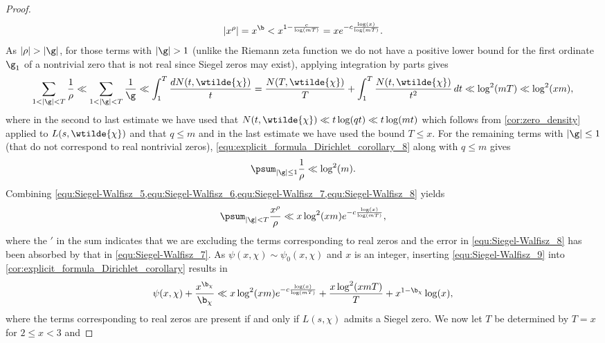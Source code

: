 \begin{proof}
      \begin{equation}\label{equ:Siegel-Walfisz_6}
        |x^{\rho}| = x^{\b} < x^{1-\frac{c}{\log(mT)}} = xe^{-c\frac{\log(x)}{\log(mT)}}.
      \end{equation}
      As $|\rho| > |\g|$, for those terms with $|\g| > 1$ (unlike the Riemann zeta function we do not have a positive lower bound for the first ordinate $\g_{1}$ of a nontrivial zero that is not real since Siegel zeros may exist), applying integration by parts gives
      \begin{equation}\label{equ:Siegel-Walfisz_7}
        \sum_{1 < |\g| < T}\frac{1}{\rho} \ll \sum_{1 < |\g| < T}\frac{1}{\g} \ll \int_{1}^{T}\frac{dN(t,\wtilde{\chi})}{t} = \frac{N(T,\wtilde{\chi})}{T}+\int_{1}^{T}\frac{N(t,\wtilde{\chi})}{t^{2}}\,dt \ll \log^{2}(mT) \ll \log^{2}(xm),
      \end{equation}
      where in the second to last estimate we have used that $N(t,\wtilde{\chi}) \ll t\log(qt) \ll t\log(mt)$ which follows from \cref{cor:zero_density} applied to $L(s,\wtilde{\chi})$ and that $q \le m$ and in the last estimate we have used the bound $T \le x$. For the remaining terms with $|\g| \le 1$ (that do not correspond to real nontrivial zeros), \cref{equ:explicit_formula_Dirichlet_corollary_8} along with $q \le m$ gives
      \begin{equation}\label{equ:Siegel-Walfisz_8}
        \psum_{|\g| \le 1}\frac{1}{\rho} \ll \log^{2}(m).
      \end{equation}
      Combining \cref{equ:Siegel-Walfisz_5,equ:Siegel-Walfisz_6,equ:Siegel-Walfisz_7,equ:Siegel-Walfisz_8} yields
      \begin{equation}\label{equ:Siegel-Walfisz_9}
        \psum_{|\g| < T}\frac{x^{\rho}}{\rho} \ll x\log^{2}(xm)e^{-c\frac{\log(x)}{\log(mT)}},
      \end{equation}
      where the $'$ in the sum indicates that we are excluding the terms corresponding to real zeros and the error in \cref{equ:Siegel-Walfisz_8} has been absorbed by that in \cref{equ:Siegel-Walfisz_7}. As $\psi(x,\chi) \sim \psi_{0}(x,\chi)$ and $x$ is an integer, inserting \cref{equ:Siegel-Walfisz_9} into \cref{cor:explicit_formula_Dirichlet_corollary} results in
      \begin{equation}\label{equ:Siegel-Walfisz_10}
        \psi(x,\chi)+\frac{x^{\b_{\chi}}}{\b_{\chi}} \ll x\log^{2}(xm)e^{-c\frac{\log(x)}{\log(mT)}}+\frac{x\log^{2}(xmT)}{T}+x^{1-\b_{\chi}}\log(x),
      \end{equation}
      where the terms corresponding to real zeros are present if and only if $L(s,\chi)$ admits a Siegel zero. We now let $T$ be determined by $T = x$ for $2 \le x < 3$ and

\end{proof}
